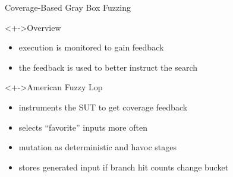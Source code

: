 \documentclass[\HandoutMode,table]{beamer}
\begin{document}
\begin{frame}{Coverage-Based Gray Box Fuzzing}
    \begin{block}<+->{Overview}
        \begin{itemize}
            \item{} execution is monitored to gain \alert{feedback}
            \item{} the feedback is used to better instruct the search
        \end{itemize}
    \end{block}
    \begin{exampleblock}<+->{American Fuzzy Lop}
        \begin{itemize}
            \item{} instruments the SUT to get coverage feedback
            \item{} selects ``favorite'' inputs more often
            \item{} mutation as deterministic and havoc stages
            \item{} stores generated input if branch hit counts change bucket
        \end{itemize}
    \end{exampleblock}
\end{frame}
\end{document}
